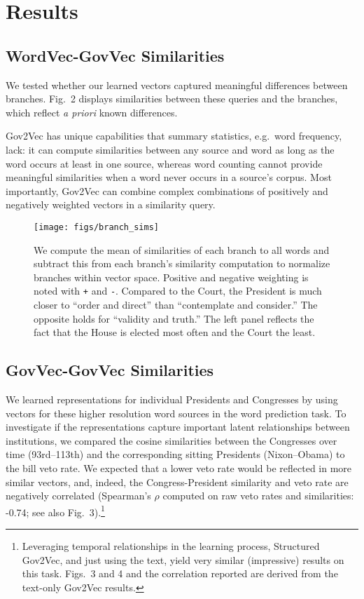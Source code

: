 \documentclass[11pt,letterpaper]{article}
\begin{document}
\section{Results}\label{results}

\subsection{WordVec-GovVec Similarities}\label{wordvec-govvec-similarities}

We tested whether our learned vectors captured meaningful differences between branches. Fig.~2 displays similarities between these queries and the branches, which reflect \textit{a priori} known differences. 

Gov2Vec has unique capabilities that summary statistics,
e.g.~word frequency, lack: it can compute similarities between any
source and word as long as the word occurs at least in one
source, whereas word counting cannot provide meaningful similarities when a word never occurs in a source's corpus. Most importantly, Gov2Vec can combine complex combinations of positively and negatively weighted vectors in a similarity query.

\begin{figure}[t]
\texttt{[image: figs/branch\_sims]}
\caption{We compute the mean of similarities of each branch to all words and subtract this from each branch's similarity computation to normalize branches within vector space. Positive and negative weighting is noted with \texttt{+} and \texttt{-}. Compared to the Court, the President is much closer to ``order and direct'' than ``contemplate and consider.'' The opposite holds for ``validity and truth.'' The left panel reflects the fact that the House is elected most often and the Court the least.}
\end{figure}

\subsection{GovVec-GovVec Similarities}\label{govvec-govvec-similarities}

We learned representations for individual Presidents and Congresses by
using vectors for these higher resolution word sources in the
word prediction task. To investigate if the representations capture
important latent relationships between institutions, we compared the
cosine similarities between the Congresses over time (93rd--113th) and
the corresponding sitting Presidents (Nixon--Obama) to the bill
veto rate. We expected that a lower veto rate would be reflected in more similar vectors, and, indeed, the Congress-President similarity and veto rate are negatively correlated (Spearman's \(\rho\) computed on raw veto rates and similarities: -0.74; see also Fig.~3).\footnote{Leveraging temporal relationships in the learning process, Structured Gov2Vec, and just using the text, yield very similar (impressive) results on this task. Figs.~3 and 4 and the correlation reported are derived from the text-only Gov2Vec results.}
\end{document}
